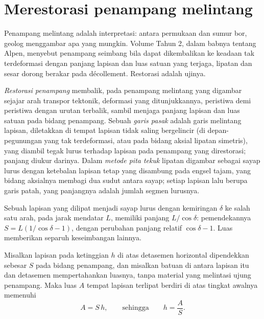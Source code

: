 \section{Merestorasi penampang melintang}\label{sec:b3:structural-analysis:restoration}

Penampang melintang adalah interpretasi: antara permukaan dan sumur bor,
geolog menggambar apa yang mungkin. Volume Tahun 2, dalam babnya tentang
Alpen, menyebut penampang seimbang bila dapat dikembalikan ke keadaan tak terdeformasi
dengan panjang lapisan dan luas satuan yang terjaga, lipatan dan
sesar dorong berakar pada décollement. Restorasi adalah ujinya.

\begin{definition}\label{def:b3:structural-analysis:restoration}
\emph{Restorasi penampang} membalik, pada
penampang melintang yang digambar sejajar arah transpor tektonik, deformasi
yang ditunjukkannya, peristiwa demi peristiwa dengan urutan terbalik, sambil menjaga
panjang lapisan dan luas satuan pada bidang penampang.
Sebuah \emph{garis pasak} adalah garis melintang lapisan, diletakkan di tempat
lapisan tidak saling bergelincir (di depan-pegunungan yang tak terdeformasi, atau pada
bidang aksial lipatan simetris), yang diambil tegak lurus terhadap lapisan
pada penampang yang direstorasi; panjang diukur darinya. Dalam
\emph{metode pita tekuk} lipatan digambar sebagai sayap lurus
dengan ketebalan lapisan tetap yang disambung pada engsel tajam, yang bidang aksialnya
membagi dua sudut antara sayap; setiap lapisan lalu berupa garis patah, yang
panjangnya adalah jumlah segmen lurusnya.
\end{definition}

Sebuah lapisan yang dilipat menjadi sayap lurus dengan kemiringan $\delta$ ke salah satu arah, pada
jarak mendatar $L$, memiliki panjang $L/\cos\delta$: pemendekannya
$S = L(1/\cos\delta - 1)$, dengan perubahan panjang relatif $\cos\delta - 1$.
Luas memberikan separuh keseimbangan lainnya.

\begin{proposition}\label{prop:b3:structural-analysis:detachment}
Misalkan lapisan pada ketinggian $h$ di atas detasemen horizontal dipendekkan sebesar $S$
pada bidang penampang, dan misalkan batuan di antara lapisan itu dan detasemen
mempertahankan luasnya, tanpa material yang melintasi ujung penampang. Maka
luas $A$ tempat lapisan terlipat berdiri di atas tingkat awalnya memenuhi
\[
  A = S\,h , \qquad\text{sehingga}\qquad h = \frac AS .
\]
\end{proposition}

